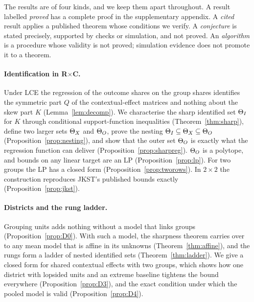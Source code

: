 The results are of four kinds, and we keep them apart throughout. A result
labelled \emph{proved} has a complete proof in the supplementary appendix. A
\emph{cited} result applies a published theorem whose conditions we verify. A
\emph{conjecture} is stated precisely, supported by checks or simulation, and
not proved. An \emph{algorithm} is a procedure whose validity is not proved;
simulation evidence does not promote it to a theorem.

\paragraph{Identification in R$\times$C.} Under LCE the regression of the outcome
shares on the group shares identifies the symmetric part $Q$ of the
contextual-effect matrices and nothing about the skew part $K$
(Lemma~\ref{lem:decomp}). We characterise the sharp identified set $\Theta_I$ for
$K$ through conditional support-function inequalities (Theorem~\ref{thm:sharp}),
define two larger sets $\Theta_X$ and $\Theta_O$, prove the nesting
$\Theta_I\subseteq\Theta_X\subseteq\Theta_O$ (Proposition~\ref{prop:nesting}), and show that
the outer set $\Theta_O$ is exactly what the regression function can deliver
(Proposition~\ref{prop:sharpreg}). $\Theta_O$ is a polytope, and bounds on any linear
target are an LP (Proposition~\ref{prop:lp}). For two groups the LP has a closed
form (Proposition~\ref{prop:tworows}). In $2\times2$ the construction reproduces
JKST's published bounds exactly (Proposition~\ref{prop:jkst}).

\paragraph{Districts and the rung ladder.} Grouping units adds nothing without a
model that links groups (Proposition~\ref{prop:D0}). With such a model, the
sharpness theorem carries over to any mean model that is affine in its unknowns
(Theorem~\ref{thm:affine}), and the rungs form a ladder of nested identified sets
(Theorem~\ref{thm:ladder}). We give a closed form for shared contextual effects
with two groups, which shows how one district with lopsided units and an extreme
baseline tightens the bound everywhere (Proposition~\ref{prop:D3}), and the exact
condition under which the pooled model is valid (Proposition~\ref{prop:D4}).


